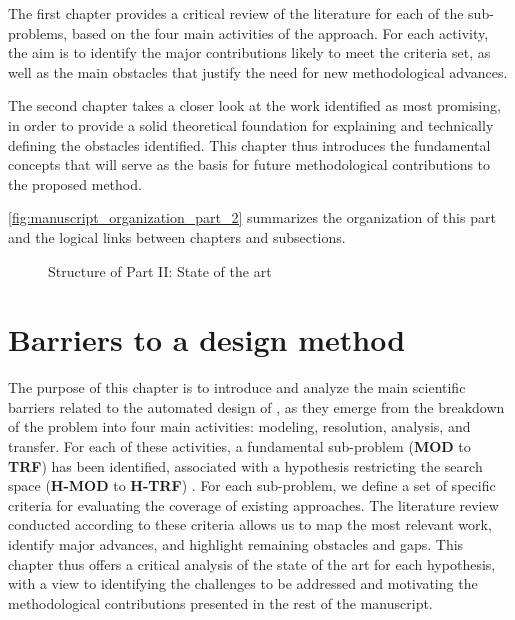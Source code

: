 The first chapter provides a critical review of the literature for each of the sub-problems, based on the four main activities of the approach. For each activity, the aim is to identify the major contributions likely to meet the criteria set, as well as the main obstacles that justify the need for new methodological advances.

The second chapter takes a closer look at the work identified as most promising, in order to provide a solid theoretical foundation for explaining and technically defining the obstacles identified. This chapter thus introduces the fundamental concepts that will serve as the basis for future methodological contributions to the proposed method.

\autoref{fig:manuscript_organization_part_2} summarizes the organization of this part and the logical links between chapters and subsections.


\begin{figure}[h!]
  \centering
  \resizebox{0.8\textwidth}{!}{%
    
  }
  \caption{Structure of Part II: State of the art}
  \label{fig:manuscript_organization_part_2}
\end{figure}

\clearpage
\thispagestyle{empty}
\null
\newpage


\chapter{Barriers to a design method}
\label{chap:barriers}

\noindent
The purpose of this chapter is to introduce and analyze the main scientific barriers related to the automated design of , as they emerge from the breakdown of the problem into four main activities: modeling, resolution, analysis, and transfer. For each of these activities, a fundamental sub-problem (\textbf{MOD} to \textbf{TRF}) has been identified, associated with a hypothesis restricting the search space (\textbf{H-MOD} to \textbf{H-TRF}) . For each sub-problem, we define a set of specific criteria for evaluating the coverage of existing approaches. The literature review conducted according to these criteria allows us to map the most relevant work, identify major advances, and highlight remaining obstacles and gaps. This chapter thus offers a critical analysis of the state of the art for each hypothesis, with a view to identifying the challenges to be addressed and motivating the methodological contributions presented in the rest of the manuscript.

